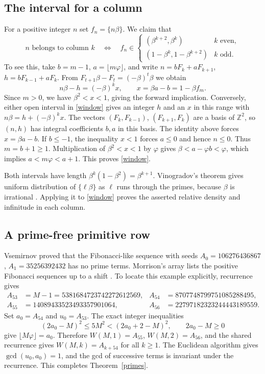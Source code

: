 \documentclass[11pt]{article}
\newcommand{\ph}{\varphi}
\newcommand{\fl}[1]{\lfloor #1\rfloor}
\newcommand{\fr}[1]{\{#1\}}
\begin{document}
\subsection*{The interval for a column}
For a positive integer $n$ set $f_n=\fr{n\beta}$. We claim that
\begin{equation}\label{window}
 n\text{ belongs to column }k
 \quad\Longleftrightarrow\quad
 f_n\in
 \begin{cases}
 (\beta^{k+2},\beta^k) & k\text{ even},\\
 (1-\beta^k,1-\beta^{k+2}) & k\text{ odd}.
 \end{cases}
\end{equation}
To see this, take $b=m-1$, $a=\fl{m\ph}$, and write
$n=bF_k+aF_{k+1}$, $h=bF_{k-1}+aF_k$. From
$F_{t+1}\beta-F_t=(-\beta)^t\beta$ we obtain
\[
 n\beta-h=(-\beta)^k x,\qquad x=\beta a-b=1-\beta f_m .
\]
Since $m>0$, we have $\beta^2<x<1$, giving the forward implication.
Conversely, either open interval in \eqref{window} gives an integer $h$
and an $x$ in this range with $n\beta=h+(-\beta)^k x$. The vectors
$(F_k,F_{k-1})$, $(F_{k+1},F_k)$ are a basis of $\mathbb Z^2$, so
$(n,h)$ has integral coefficients $b,a$ in this basis. The identity above
forces $x=\beta a-b$. If $b\le-1$, the inequality $x<1$ forces $a\le0$
and hence $n\le0$. Thus $m=b+1\ge1$. Multiplication of
$\beta^2<x<1$ by $\ph$ gives $\beta<a-\ph b<\ph$,
which implies $a<m\ph<a+1$. This proves \eqref{window}.

Both intervals have length $\beta^k(1-\beta^2)=\beta^{k+1}$.
Vinogradov's theorem gives uniform distribution of $\fr{\ell\beta}$
as $\ell$ runs through the primes, because $\beta$ is irrational
\cite[\S5]{vinogradov}. Applying it to \eqref{window} proves the asserted
relative density and infinitude in each column.

\subsection*{A prime-free primitive row}
Vsemirnov \cite{vsemirnov} proved that the Fibonacci-like sequence with seeds
$A_0=106276436867$, $A_1=35256392432$ has no prime terms.
Morrison's array lists the positive Fibonacci sequences up to a shift
\cite{morrison,orderings}. To locate this example explicitly, recurrence gives
\begin{align*}
 A_{53}&=M-1=5381684723742272612569,&
 A_{54}&=8707748799751085288495,\\
 A_{55}&=14089433523493357901064,&
 A_{56}&=22797182323244443189559.
\end{align*}
Set $a_0=A_{54}$ and $u_0=A_{53}$. The exact integer inequalities
\[
 (2a_0-M)^2\le 5M^2<(2a_0+2-M)^2,\qquad 2a_0-M\ge0
\]
give $\fl{M\ph}=a_0$. Therefore $W(M,1)=A_{55}$, $W(M,2)=A_{56}$,
and the shared recurrence gives $W(M,k)=A_{k+54}$ for all $k\ge1$.
The Euclidean algorithm gives $\gcd(u_0,a_0)=1$, and the gcd of successive
terms is invariant under the recurrence. This completes Theorem~\ref{primes}.
\end{document}
